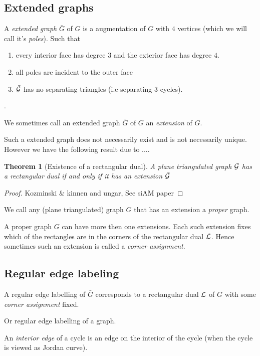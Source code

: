 \documentclass[a4paper]{article}
\newtheorem{thrm}{Theorem}
\theoremstyle{definition}
\newcommand{\scr}[1]{\mathcal{#1}}
\newcommand{\ifftext}{if and only if }
\begin{document}
\subsection{Extended graphs}
\newcommand{\ext}[1]{\bar{#1}}
A \emph{extended graph} $\ext G$ of $G$ is a augmentation of $G$ with $4$  vertices (which we will call it's \emph{poles}). Such that 
\begin{enumerate}
\item every interior face has degree $3$ and the exterior face has degree $4$.
\item all poles are incident to the outer face
\item $\ext\G$ has no separating triangles (i.e separating $3$-cycles).
\end{enumerate}.

We sometimes call an extended graph $\ext G$ of $G$ an \emph{extension} of $G$.

Such a extended graph does not necessarily exist and is not necessarily unique.  %
However we have the following result due to .... %

\begin{thrm}[Existence of a rectangular dual]
A plane triangulated graph $\G$ has a rectangular dual \ifftext it has an extension $\ext \G$
\end{thrm}

\begin{proof}
Kozminski \& kinnen and ungar, See siAM paper %
\end{proof}

We call any (plane triangulated) graph $G$ that has an extension a \emph{proper} graph.

A proper graph $G$ can have more then one extensions. Each such extension fixes which of the rectangles are in the corners of the rectangular dual $\L$. Hence sometimes such an extension is called a \emph{corner assignment}.


\subsection{Regular edge labeling}
A regular edge labelling  of $\ext G$ corresponds to a rectangular dual $\L$ of $G$ with some \emph{corner assignment} fixed. %

Or regular edge labelling of a graph.

\newcommand{\C}{\scr C}

An \emph{interior edge} of a cycle is an edge on the interior of the cycle (when the cycle is viewed as Jordan curve).
\end{document}
